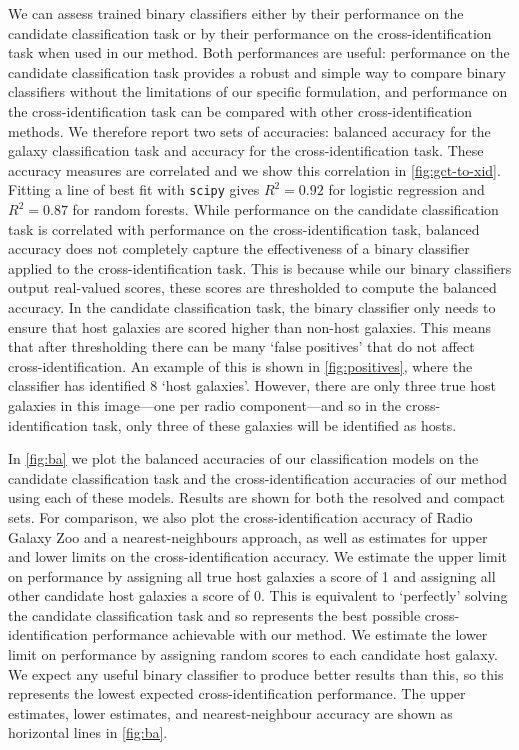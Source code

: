     {We can assess trained binary classifiers either by their performance on
    the candidate classification task or by their performance on the
    cross-identification task when used in our method. Both performances are
    useful: performance on the candidate classification task provides a robust
    and simple way to compare binary classifiers without the limitations of
    our specific formulation, and performance on the cross-identification task
    can be compared with other cross-identification methods. We therefore
    report two sets of accuracies: balanced accuracy for the galaxy
    classification task and accuracy for the cross-identification task. These
    accuracy measures are correlated and we show this correlation in
    \autoref{fig:gct-to-xid}. Fitting a line of best fit with \texttt{scipy}
    gives $R^2 = 0.92$ for logistic regression and $R^2 = 0.87$ for random
    forests. While performance on the candidate classification task is correlated
    with performance on the cross-identification task, balanced accuracy does
    not completely capture the effectiveness of a binary classifier applied to
    the cross-identification task. {This is because while our binary
    classifiers output real-valued scores, these scores are thresholded to
    compute the balanced accuracy}. In the candidate classification
    task, the binary classifier only needs to ensure that host galaxies are
    {scored higher} than non-host galaxies. This means
    {that after thresholding} there can be
    many `false positives' that do not affect cross-identification. An example
    of this is shown in \autoref{fig:positives}, where the classifier has
    identified 8 `host galaxies'. However, there are only three true host
    galaxies in this image---one per radio component---and so in the
    cross-identification task, only three of these galaxies will be identified
    as hosts.}

    In \autoref{fig:ba} we plot {the balanced accuracies of our classification models
    on the candidate classification task and the cross-identification
    accuracies of our method using each of these models. Results are shown for both
    the resolved and compact sets.} For comparison, we also plot the cross-identification accuracy of Radio Galaxy
    Zoo and a nearest-neighbours approach, as well as estimates for upper and
    lower limits on the cross-identification accuracy. {We estimate the upper limit on performance by assigning all
    true host galaxies a score of 1 and
    assigning all other candidate host galaxies a score of 0. This
    is equivalent to `perfectly' solving the candidate classification task and so
    represents the best possible cross-identification performance achievable
    with our method. We estimate the lower limit on performance by {
    assigning random scores to each candidate host galaxy}. We expect any
    useful binary classifier to produce better
    results than this, so this represents the lowest expected
    cross-identification performance.} The upper estimates, lower estimates,
    and nearest-neighbour accuracy are shown as horizontal lines in
    \autoref{fig:ba}.

